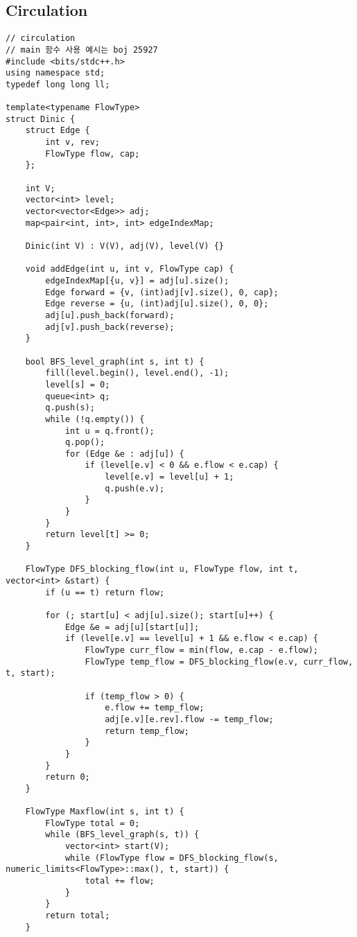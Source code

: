 \documentclass[landscape, 8pt, a4paper, oneside, twocolumn]{extarticle}
\begin{document}
    \subsection{Circulation}
    \begin{verbatim}
// circulation
// main 함수 사용 예시는 boj 25927
#include <bits/stdc++.h>
using namespace std;
typedef long long ll;

template<typename FlowType>
struct Dinic {
    struct Edge {
        int v, rev;
        FlowType flow, cap;
    };

    int V;
    vector<int> level;
    vector<vector<Edge>> adj;
    map<pair<int, int>, int> edgeIndexMap;

    Dinic(int V) : V(V), adj(V), level(V) {}

    void addEdge(int u, int v, FlowType cap) {
        edgeIndexMap[{u, v}] = adj[u].size();
        Edge forward = {v, (int)adj[v].size(), 0, cap};
        Edge reverse = {u, (int)adj[u].size(), 0, 0};
        adj[u].push_back(forward);
        adj[v].push_back(reverse);
    }

    bool BFS_level_graph(int s, int t) {
        fill(level.begin(), level.end(), -1);
        level[s] = 0;
        queue<int> q;
        q.push(s);
        while (!q.empty()) {
            int u = q.front();
            q.pop();
            for (Edge &e : adj[u]) {
                if (level[e.v] < 0 && e.flow < e.cap) {
                    level[e.v] = level[u] + 1;
                    q.push(e.v);
                }
            }
        }
        return level[t] >= 0;
    }

    FlowType DFS_blocking_flow(int u, FlowType flow, int t, vector<int> &start) {
        if (u == t) return flow;

        for (; start[u] < adj[u].size(); start[u]++) {
            Edge &e = adj[u][start[u]];
            if (level[e.v] == level[u] + 1 && e.flow < e.cap) {
                FlowType curr_flow = min(flow, e.cap - e.flow);
                FlowType temp_flow = DFS_blocking_flow(e.v, curr_flow, t, start);

                if (temp_flow > 0) {
                    e.flow += temp_flow;
                    adj[e.v][e.rev].flow -= temp_flow;
                    return temp_flow;
                }
            }
        }
        return 0;
    }

    FlowType Maxflow(int s, int t) {
        FlowType total = 0;
        while (BFS_level_graph(s, t)) {
            vector<int> start(V);
            while (FlowType flow = DFS_blocking_flow(s, numeric_limits<FlowType>::max(), t, start)) {
                total += flow;
            }
        }
        return total;
    }


\end{verbatim}
\end{document}
